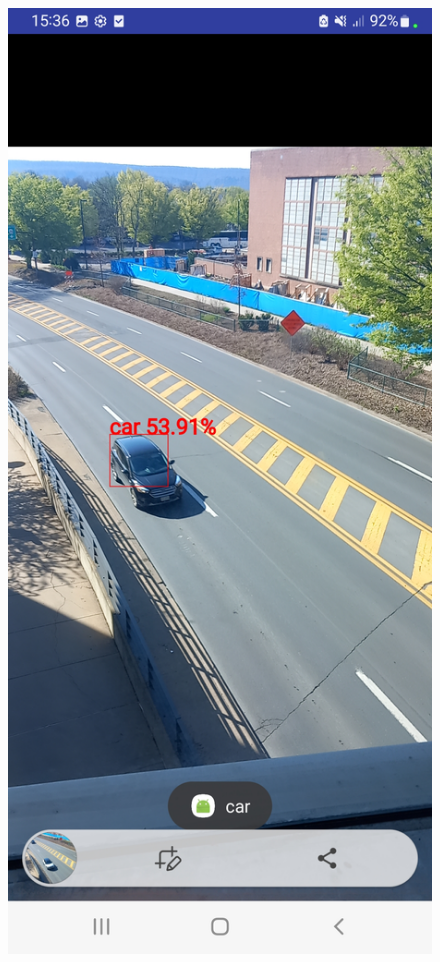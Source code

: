 \begin{figure}[H]
    \centering
    \includegraphics[scale=0.11]{figure/ObjectDetection_car.jpg}

\end{figure}
